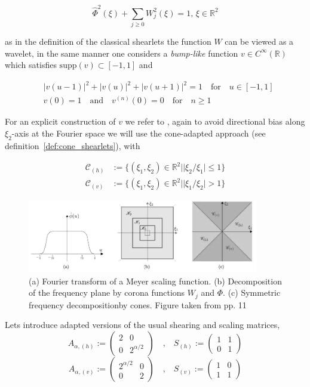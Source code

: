 $$
\hat{\Phi}^2(\xi)+\sum_{j\geq 0} W^2_j(\xi)=1\text{,   }\xi\in\mathbb{R}^2
$$ 

as in the definition of the classical shearlets the function $W$ can be viewed as a wavelet, in the same manner one considers a \textit{bump-like} function $v\in C^{\infty}(\mathbb{R})$ which satisfies $\text{supp}(v)\subset [-1,1]$ and 

\begin{align}
& |v(u-1)|^2+|v(u)|^2+|v(u+1)|^2 = 1 \quad \textrm{for} \quad u\in[-1,1] \label{eq:alpha33}\\
& v(0)=1 \quad \textrm{and} \quad v^{(n)}(0)=0\quad\textrm{for}\quad n\geq 1\label{eq:alpha34}
\end{align}

For an explicit construction of $v$ we refer to \cite{Guo-Labate}, again to avoid directional bias along $\xi_2$-axis at the Fourier space we will use the cone-adapted approach (see definition~\ref{def:cone_shearlets}), with 

$$
\begin{aligned}
\mathcal{C}_{(h)} &:=\{ (\xi_1,\xi_2)\in\mathbb{R}^2||\xi_2/\xi_1|\leq 1\}\\
\mathcal{C}_{(v)} &:=\{ (\xi_1,\xi_2)\in\mathbb{R}^2||\xi_1/\xi_2|>1\}
\end{aligned}
$$

\begin{figure}[h!]
\centering
\includegraphics[width=0.9\textwidth]{./Diagrams/alphapartcones.jpg}
\caption{(a) Fourier transform of a Meyer scaling function. (b) Decomposition of the frequency plane by corona functions $W_j$ and $\Phi$. (c) Symmetric frequency decompositionby cones. Figure taken from \cite{Gitta-alpha} pp. 11}
\label{fig:separable_nonseparable1}
\end{figure}

Lets introduce adapted versions of the usual shearing and scaling matrices,
$$
A_{\alpha,(h)}:=\left(\begin{matrix} 2 & 0 \\ 0 & 2^{\alpha/2}\end{matrix}\right) \quad \textrm{,}\quad S_{(h)}:=\left(\begin{matrix} 1 & 1\\ 0 & 1\end{matrix}\right)
$$
$$
A_{\alpha,(v)}:=\left(\begin{matrix}2^{\alpha/2} & 0 \\ 0 & 2 \end{matrix}\right)\quad \textrm{,}\quad S_{(v)}:=\left(\begin{matrix} 1 & 0 \\ 1 & 1\end{matrix}\right)
$$

